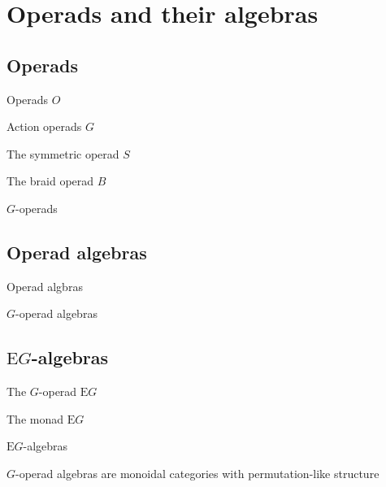 \chapter{Operads and their algebras}

\section{Operads}

\begin{defn} Operads $O$ \end{defn}

\begin{defn} Action operads $G$ \end{defn}

\begin{example} The symmetric operad $S$ \end{example}

\begin{example} The braid operad $B$ \end{example}

\begin{defn} $G$-operads \end{defn}

\section{Operad algebras}

\begin{defn} Operad algbras \end{defn}

\begin{defn} $G$-operad algebras \end{defn}

\section{$\mathrm{E}G$-algebras}

\begin{defn} The $G$-operad $\mathrm{E}G$ \end{defn}

\begin{defn}\label{monaddef} The monad $\mathrm{E}G$ \end{defn}

\begin{defn} $\mathrm{E}G$-algebras \end{defn}

\begin{prop} $G$-operad algebras are monoidal categories with permutation-like structure \end{prop} 

